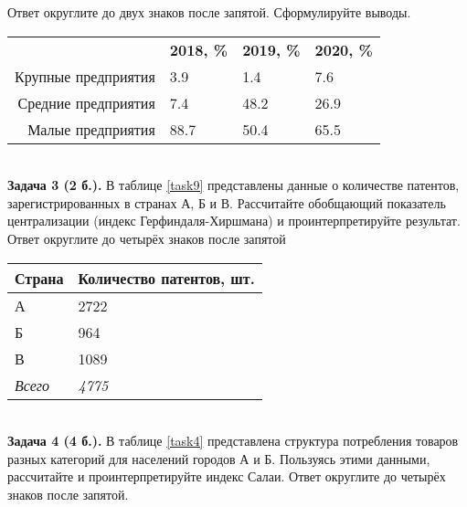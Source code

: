 \documentclass{article}
\begin{document}
Ответ округлите до двух знаков после запятой. Сформулируйте выводы.\\

\begin{minipage}{\textwidth}
\centering
\begin{tabularx}{0.8\textwidth}{rYYY}
\toprule
 & \textbf{2018, \%} & \textbf{2019, \%} & \textbf{2020, \%} \\
\cmidrule(lr){2-2}\cmidrule(lr){3-3}\cmidrule(lr){4-4}
Крупные предприятия & 3.9 & 1.4 & 7.6 \\

Средние предприятия & 7.4 & 48.2 & 26.9 \\

Малые предприятия & 88.7 & 50.4 & 65.5 \\
\bottomrule
\end{tabularx}
\label{task2}
\end{minipage} \\[35pt]

\textbf{Задача 3 (2 б.).} В таблице \ref{task9} представлены данные о количестве патентов, зарегистрированных в странах А, Б и В. Рассчитайте обобщающий показатель централизации (индекс Герфиндаля-Хиршмана) и проинтерпретируйте результат. Ответ округлите до четырёх знаков после запятой\\

\begin{minipage}{\textwidth}
\centering
\begin{tabularx}{0.4\textwidth}{YY}
\toprule
\textbf{Страна} & \textbf{Количество патентов, шт.} \\
\midrule
А & 2722 \\

Б & 964 \\

В & 1089 \\
\addlinespace
\textit{Всего} & \textit{4775} \\
\bottomrule
\end{tabularx}
\label{task9}
\end{minipage} \\[35pt]

\textbf{Задача 4 (4 б.).} В таблице \ref{task4} представлена структура потребления товаров разных категорий для населений городов А и Б. Пользуясь этими данными, рассчитайте и проинтерпретируйте индекс Салаи. Ответ округлите до четырёх знаков после запятой.\\
\end{document}
